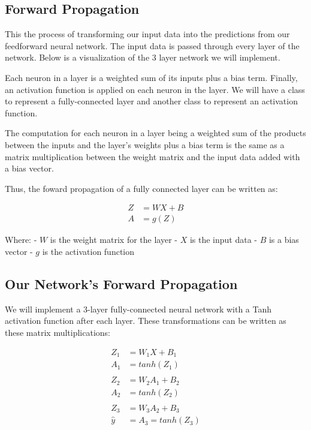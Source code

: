 \documentclass[11pt]{article}
\begin{document}
    \subsection{Forward Propagation}\label{forward-propagation}

This the process of transforming our input data into the predictions
from our feedforward neural network. The input data is passed through
every layer of the network. Below is a visualization of the 3 layer
network we will implement.

    Each neuron in a layer is a weighted sum of its inputs plus a bias term.
Finally, an activation function is applied on each neuron in the layer.
We will have a class to represent a fully-connected layer and another
class to represent an activation function.

The computation for each neuron in a layer being a weighted sum of the
products between the inputs and the layer's weights plus a bias term is
the same as a matrix multiplication between the weight matrix and the
input data added with a bias vector.

Thus, the foward propagation of a fully connected layer can be written
as:

\begin{align*}
Z &= W X + B \\
A &= g(Z)
\end{align*}

Where: - \(W\) is the weight matrix for the layer - \(X\) is the input
data - \(B\) is a bias vector - \(g\) is the activation function

    \subsection{Our Network's Forward
Propagation}\label{our-networks-forward-propagation}

    We will implement a 3-layer fully-connected neural network with a Tanh
activation function after each layer. These transformations can be
written as these matrix multiplications:

\begin{align*}
Z_1 &= W_1 X + B_1 \\
A_1 &= tanh(Z_1) \\
\\
Z_2 &= W_2 A_1 + B_2 \\
A_2 &= tanh(Z_2) \\
\\
Z_3 &= W_3 A_2 + B_3 \\
\hat{y} &= A_3 = tanh(Z_3)
\end{align*}
\end{document}
